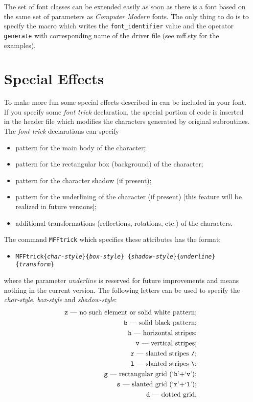 The set of font classes
can be extended easily as soon as there is a font based
on the same set of parameters as {\sl Computer Modern} fonts.
The only thing to do is to specify the macro which writes the
{\tt font\_identifier} value and the operator {\tt generate}
with corresponding name of the driver file (see {\sc mff.sty}
for the examples).

\section{Special Effects\label{TRICKS}}

To make more fun some special effects described in \cite{ABC,Outline}
can be included in your font. If you specify some {\em font trick}
declaration, the special portion of \MF{} code is inserted in the
header file which modifies the characters generated by
original \MF{} subroutines.
The {\em font trick} declarations can specify
\begin{itemize}
\item pattern for the main body of the character;
\item pattern for the rectangular box (background) of the character;
\item pattern for the character shadow (if present);
\item pattern for the underlining of the character (if present)
      [this feature will be realized in future versions];
\item additional transformations (reflections, rotations, etc.)
      of the characters.
\end{itemize}
The command {\tt \bs{}MFFtrick} which specifies these attributes
has the format:
\begin{itemize}
\item[] {\tt \bs{}MFFtrick\{{\em char-style}\}\{{\em box-style}\}%
          \{{\em shadow-style}\}\{{\em underline}\}\{{\em transform}\}}
\end{itemize}
where the parameter {\em underline} is reserved for future
improvements and means nothing in the current version.
The following letters can be used to specify the
{\em char-style}, {\em box-style} and {\em shadow-style}:
\begin{eqnarray*}
&&\hbox{{\tt z} --- no such element or solid white pattern;}\\
&&\hbox{{\tt b} --- solid black pattern;}\\
&&\hbox{{\tt h} --- horizontal stripes;}\\
&&\hbox{{\tt v} --- vertical stripes;}\\
&&\hbox{{\tt r} --- slanted stripes {\tt /};}\\
&&\hbox{{\tt l} --- slanted stripes {\tt \bs};}\\
&&\hbox{{\tt g} --- rectangular grid (`{\tt h}'$+$`{\tt v}');}\\
&&\hbox{{\tt s} --- slanted grid (`{\tt r}'$+$`{\tt l}');}\\
&&\hbox{{\tt d} --- dotted grid.}
\end{eqnarray*}
